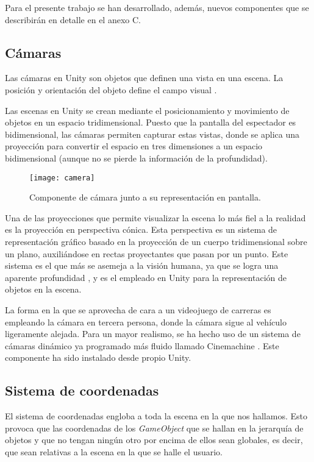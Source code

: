 Para el presente trabajo se han desarrollado, además, nuevos componentes que se describirán en detalle en el anexo C.

\subsection{Cámaras}

Las cámaras en Unity son objetos que definen una vista en una escena. La posición y orientación del objeto define el campo visual \cite{doc:cameras}.

Las escenas en Unity se crean mediante el posicionamiento y movimiento de objetos en un espacio tridimensional. Puesto que la pantalla del espectador es bidimensional, las cámaras permiten capturar estas vistas, donde se aplica una proyección para convertir el espacio en tres dimensiones a un espacio bidimensional (aunque no se pierde la información de la profundidad).

\begin{figure}[h]
	\centering
	\texttt{[image: camera]}
	\caption{Componente de cámara junto a su representación en pantalla.}
	\label{fig:camera}
\end{figure}

Una de las proyecciones que permite visualizar la escena lo más fiel a la realidad es la proyección en perspectiva cónica. Esta perspectiva es un sistema de representación gráfico basado en la proyección de un cuerpo tridimensional sobre un plano, auxiliándose en rectas proyectantes que pasan por un punto. Este sistema es el que más se asemeja a la visión humana, ya que se logra una aparente profundidad \cite{eduxg:perscon}, y es el empleado en Unity para la representación de objetos en la escena.

La forma en la que se aprovecha de cara a un videojuego de carreras es empleando la cámara en tercera persona, donde la cámara sigue al vehículo ligeramente alejada. Para un mayor realismo, se ha hecho uso de un sistema de cámaras dinámico ya programado más fluido llamado Cinemachine \cite{doc:cinemachine}. Este componente ha sido instalado desde propio Unity.

\subsection{Sistema de coordenadas}

El sistema de coordenadas engloba a toda la escena en la que nos hallamos. Esto provoca que las coordenadas de los \textit{GameObject} que se hallan en la jerarquía de objetos y que no tengan ningún otro por encima de ellos sean globales, es decir, que sean relativas a la escena en la que se halle el usuario. 

